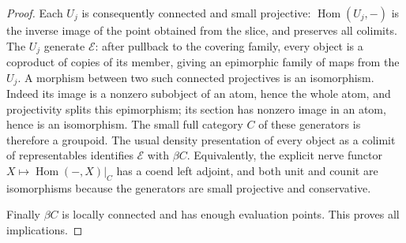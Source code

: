 \begin{proof}
Each $U_j$ is consequently connected and small projective: $\operatorname{Hom}(U_j,-)$ is the inverse image of the point obtained from the slice, and preserves all colimits. The $U_j$ generate $\mathcal E$: after pullback to the covering family, every object is a coproduct of copies of its member, giving an epimorphic family of maps from the $U_j$. A morphism between two such connected projectives is an isomorphism. Indeed its image is a nonzero subobject of an atom, hence the whole atom, and projectivity splits this epimorphism; its section has nonzero image in an atom, hence is an isomorphism. The small full category $C$ of these generators is therefore a groupoid. The usual density presentation of every object as a colimit of representables identifies $\mathcal E$ with $\beta C$. Equivalently, the explicit nerve functor $X\mapsto\operatorname{Hom}(-,X)|_C$ has a coend left adjoint, and both unit and counit are isomorphisms because the generators are small projective and conservative.

Finally $\beta C$ is locally connected and has enough evaluation points. This proves all implications. 
\end{proof}

